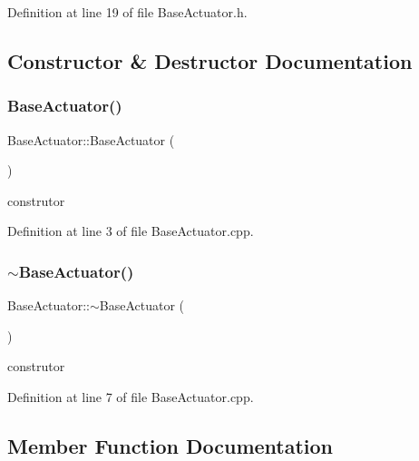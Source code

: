 Definition at line 19 of file Base\+Actuator.\+h.



\subsection{Constructor \& Destructor Documentation}
\mbox{\label{class_base_actuator_a2d0295f149b3db546762ae596d14c6d4}} 
\subsubsection{\texorpdfstring{Base\+Actuator()}{BaseActuator()}}
{\footnotesize\ttfamily Base\+Actuator\+::\+Base\+Actuator (\begin{DoxyParamCaption}{ }\end{DoxyParamCaption})}



construtor 



Definition at line 3 of file Base\+Actuator.\+cpp.

\mbox{\label{class_base_actuator_a7326269c65ea05ce4b6aa0333984bf56}} 
\subsubsection{\texorpdfstring{$\sim$\+Base\+Actuator()}{~BaseActuator()}}
{\footnotesize\ttfamily Base\+Actuator\+::$\sim$\+Base\+Actuator (\begin{DoxyParamCaption}{ }\end{DoxyParamCaption})}



construtor 



Definition at line 7 of file Base\+Actuator.\+cpp.



\subsection{Member Function Documentation}
\mbox{\label{class_base_actuator_aa37ef0301610ceba649c25bdaa71fa87}} 
